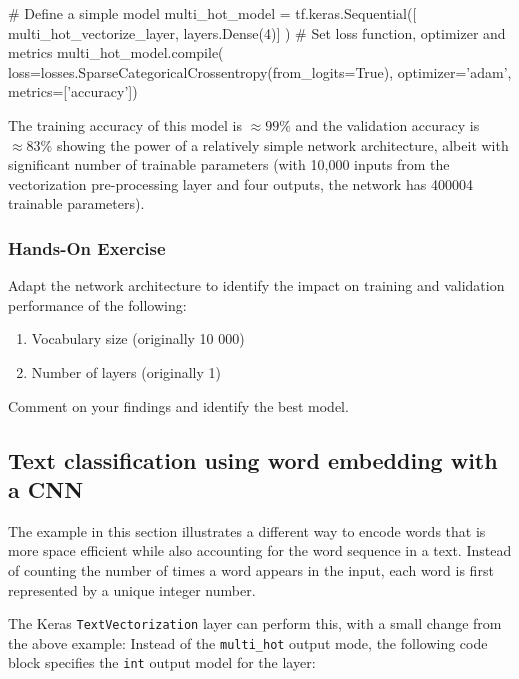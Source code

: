 \begin{samepage}
\begin{pythoncode}
# Define a simple model
multi_hot_model = tf.keras.Sequential([
    multi_hot_vectorize_layer,
    layers.Dense(4)]
)
# Set loss function, optimizer and metrics
multi_hot_model.compile(
    loss=losses.SparseCategoricalCrossentropy(from_logits=True),
    optimizer='adam', metrics=['accuracy'])
\end{pythoncode}
\end{samepage}

The training accuracy of this model is $\approx 99\%$ and the validation accuracy is $\approx 83\%$ showing the power of a relatively simple network architecture, albeit with significant number of trainable parameters (with 10,000 inputs from the vectorization pre-processing layer and four outputs, the network has 400004 trainable parameters).

\begin{tcolorbox}[colback=code]
\subsubsection*{Hands-On Exercise} 
Adapt the network architecture to identify the impact on training and validation performance of the following:
   \begin{enumerate}
      \item Vocabulary size (originally 10 000)
      \item Number of layers (originally 1)
   \end{enumerate}
Comment on your findings and identify the best model.
\end{tcolorbox}

\subsection[Word Embedding]{Text classification using word embedding with a CNN}

The example in this section illustrates a different way to encode words that is more space efficient while also accounting for the word sequence in a text. Instead of counting the number of times a word appears in the input, each word is first represented by a unique integer number. 

The Keras \texttt{TextVectorization} layer can perform this, with a small change from the above example: Instead of the \texttt{multi\_hot} output mode, the following code block specifies the \texttt{int} output model for the layer:

